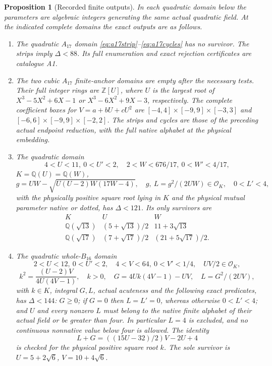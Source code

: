 \documentclass[11pt]{article}
\newtheorem{proposition}[theorem]{Proposition}
\theoremstyle{remark}\newtheorem{remark}[theorem]{Remark}
\numberwithin{equation}{section}
\newcommand{\Q}{\mathbb Q}
\newcommand{\Z}{\mathbb Z}
\newcommand{\OK}{\mathcal O_K}
\begin{document}
\begin{proposition}[Recorded finite outputs]\label{arith:prop:pair-output}
In each quadratic domain below the parameters are algebraic integers
generating the same actual quadratic field. At the indicated complete
domains the exact outputs are as follows.
\begin{enumerate}
\item The quadratic $A_{17}$ domain
\eqref{eq:a17strip}--\eqref{eq:a17cycles} has no survivor.
The strips imply $\Delta<88$. Its full enumeration and exact rejection
certificates are catalogue A1.
\item The two cubic $A_{17}$ finite-anchor domains are empty after the necessary tests. Their full integer rings are $\Z[U]$,
where $U$ is the largest root of $X^3-5X^2+6X-1$ or
$X^3-6X^2+9X-3$, respectively. The complete coefficient boxes
for $V=a+bU+cU^2$ are
$[-4,4]\times[-9,9]\times[-3,3]$ and
$[-6,6]\times[-9,9]\times[-2,2]$.
The strips and cycles are those of the preceding actual endpoint
reduction, with the full native alphabet at the physical embedding.
\item The quadratic domain
 \[
 4<U<11,\ 0<U'<2,\quad2<W<676/17,\ 0<W'<4/17,
\]
$K=\Q(U)=\Q(W)$,
\[
 g=UW-\sqrt{U(U-2)W(17W-4)},\quad
 g,\ L=g^2/(2UW)\in\OK,\quad0<L'<4,
\]
with the physically positive square root lying in $K$ and the physical
mutual parameter native or dotted, has $\Delta<121$. Its only survivors are
 \[
 \begin{array}{c|cc}
 K&U&W\\\hline
 \Q(\sqrt{13})&(5+\sqrt{13})/2&11+3\sqrt{13}\\
 \Q(\sqrt{17})&(7+\sqrt{17})/2&(21+5\sqrt{17})/2 .
 \end{array}
\]
\item The quadratic whole-$B_{16}$ domain
 \[
 2<U<12,\ 0<U'<2,\quad4<V<64,\ 0<V'<1/4,\quad UV/2\in\OK,
\]
\[
 k^2=\frac{(U-2)V}{4U(4V-1)},\quad k>0,\quad
 G=4Uk(4V-1)-UV,\quad L=G^2/(2UV),
\]
with $k\in K$, integral $G,L$, actual acuteness and
the following exact predicates, has $\Delta<144$:
$G\ge0$; if $G=0$ then $L=L'=0$, whereas otherwise
 $0<L'<4$; and $U$ and every nonzero $L$ must belong to the native finite alphabet
of their actual field or be greater than four. In particular $L=4$
is excluded, and no continuous nonnative value below four is allowed.
The identity
 \[
 L+G=((15U-32)/2)V-2U+4
\]
is checked for the physical positive square root $k$.
The sole survivor is $U=5+2\sqrt6$, $V=10+4\sqrt6$.
\end{enumerate}
\end{proposition}
\end{document}
